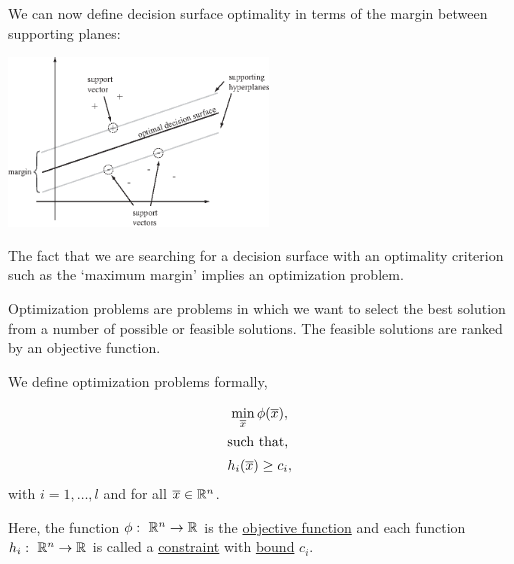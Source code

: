 \documentclass[a4paper,blends,pdf,colorBG,slideColor]{prosper}
\begin{document}

\es


We can now define decision surface optimality in terms of the margin between supporting planes:


\begin{center}
\includegraphics[height=45mm]{figures/fig06-03.eps}
\end{center}

\es

The fact that we are searching for a decision surface with an optimality  criterion such as
the `maximum margin' implies an optimization problem.

Optimization problems are problems in which we want to select the best 
solution from a number of possible or feasible solutions.
The feasible solutions are ranked by an objective function.

We define optimization problems formally,

\begin{gather*}
\min_{\overline{x}} \phi(\overline{x}), \\
\intertext{such that,}
\label{eq:opt-problem-constraints}
h_i(\overline{x}) \ge c_i,
\end{gather*}
with $i = 1,\ldots,l$ and for all $\overline{x}\in \mathbb{R}^{n}$.  

Here, the function $\phi\,\colon\; \mathbb{R}^{n} \rightarrow \mathbb{R}$ is the \ul{objective function} and
each function $h_i\,\colon\; \mathbb{R}^{n} \rightarrow \mathbb{R}$ is called a \ul{constraint} with
\ul{bound} $c_i$.
\end{document}
